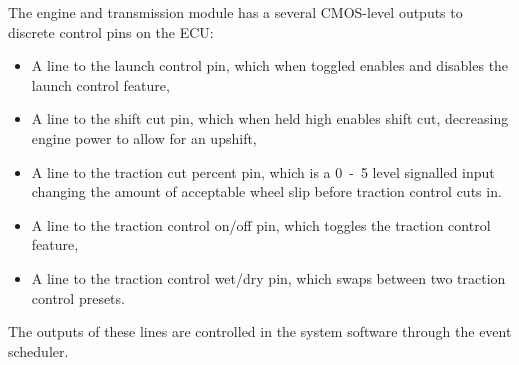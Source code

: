 The engine and transmission module has a several CMOS-level outputs to discrete control pins on the ECU:

\begin{itemize}
  \item A line to the launch control pin, which when toggled enables and disables the launch control feature,
  \item A line to the shift cut pin, which when held high enables shift cut, decreasing engine power to allow for an upshift,
  \item A line to the traction cut percent pin, which is a \unit{0-5}{\volt} level signalled input changing the amount of acceptable wheel slip before traction control cuts in.
  \item A line to the traction control on/off pin, which toggles the traction control feature,
  \item A line to the traction control wet/dry pin, which swaps between two traction control presets.
\end{itemize}

The outputs of these lines are controlled in the system software through the event scheduler. 